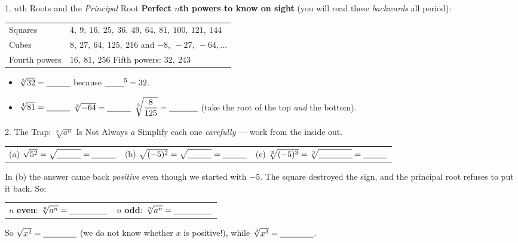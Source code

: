 \documentclass[10pt]{article}
\begin{document}
\begin{notesbox}{1. $n$th Roots and the \emph{Principal} Root}
\vspace{3pt}
\textbf{Perfect $n$th powers to know on sight} (you will read these \emph{backwards} all period):
\begin{center}
\renewcommand{\arraystretch}{1.3}
\begin{tabularx}{\linewidth}{@{}l X@{}}
Squares & $4,\ 9,\ 16,\ 25,\ 36,\ 49,\ 64,\ 81,\ 100,\ 121,\ 144$ \\
Cubes   & $8,\ 27,\ 64,\ 125,\ 216$ \quad and $-8,\ -27,\ -64,\dots$ \\
Fourth powers & $16,\ 81,\ 256$ \qquad Fifth powers: $32,\ 243$ \\
\end{tabularx}
\end{center}
\begin{itemize}[leftmargin=1.5em, itemsep=2pt]
  \item $\sqrt[5]{32}=\blank{1.0cm}$ \quad because $\blank{0.8cm}^5=32$.
  \item $\sqrt[4]{81}=\blank{1.0cm}$ \quad $\sqrt[3]{-64}=\blank{1.0cm}$ \quad
        $\sqrt[3]{\dfrac{8}{125}}=\blank{1.2cm}$ \quad (take the root of the top \emph{and} the bottom).
\end{itemize}
\end{notesbox}

\begin{notesbox}{2. The Trap: $\sqrt[n]{a^n}$ Is Not Always $a$}
Simplify each one \emph{carefully} --- work from the inside out.
\begin{center}
\renewcommand{\arraystretch}{1.5}
\begin{tabular}{@{}l l l@{}}
(a) \; $\sqrt{5^2}=\sqrt{\rule{0pt}{1.7ex}\blank{1.0cm}}=\blank{1.0cm}$ &
(b) \; $\sqrt{(-5)^2}=\sqrt{\rule{0pt}{1.7ex}\blank{1.0cm}}=\blank{1.0cm}$ &
(c) \; $\sqrt[3]{(-5)^3}=\sqrt[3]{\rule{0pt}{1.7ex}\blank{1.4cm}}=\blank{1.0cm}$ \\
\end{tabular}
\end{center}
In (b) the answer came back \emph{positive} even though we started with $-5$. The square destroyed
the sign, and the principal root refuses to put it back. So:
\begin{center}
\begin{tabular}{@{}l l@{}}
$n$ \textbf{even}: \; $\sqrt[n]{a^n}=\blank{1.6cm}$ &
\qquad $n$ \textbf{odd}: \; $\sqrt[n]{a^n}=\blank{1.6cm}$ \\
\end{tabular}
\end{center}
So $\sqrt{x^2}=\blank{1.4cm}$ (we do not know whether $x$ is positive!), while
$\sqrt[3]{x^3}=\blank{1.4cm}$.
\end{notesbox}
\end{document}
